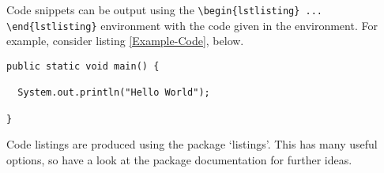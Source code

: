 \documentclass[../report.tex]{subfiles}
\begin{document}
Code snippets can be output using the \verb|\begin{lstlisting} ... \end{lstlisting}|
environment with the code given in the environment. For example, consider listing \ref{Example-Code}, below.

\begin{lstlisting}[breaklines,breakatwhitespace,caption={Example code},label=Example-Code]
public static void main() {

  System.out.println("Hello World");

}
\end{lstlisting}

Code listings are produced using the package `listings'.  This has many useful options, so have a look at the package documentation for further ideas.
\end{document}
